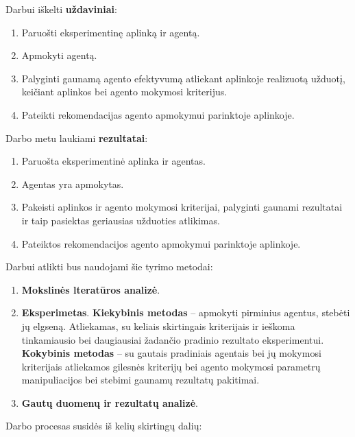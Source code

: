 \documentclass{VUMIFPSbakalaurinis}
\begin{document}
Darbui iškelti \textbf{uždaviniai}:\par

\begin{enumerate}
	\item Paruošti eksperimentinę aplinką ir agentą.
	\item Apmokyti agentą.
	\item Palyginti gaunamą agento efektyvumą atliekant aplinkoje realizuotą užduotį, keičiant aplinkos bei agento mokymosi kriterijus.
	\item Pateikti rekomendacijas agento apmokymui parinktoje aplinkoje.
\end{enumerate}

Darbo metu laukiami \textbf{rezultatai}:

\begin{enumerate}
	\item Paruošta eksperimentinė aplinka ir agentas.
	\item Agentas yra apmokytas.
	\item Pakeisti aplinkos ir agento mokymosi kriterijai, palyginti gaunami rezultatai ir taip pasiektas geriausias užduoties atlikimas.
	\item Pateiktos rekomendacijos agento apmokymui parinktoje aplinkoje.
\end{enumerate}

Darbui atlikti bus naudojami šie tyrimo metodai:

\begin{enumerate}
	\item \textbf{Mokslinės lteratūros analizė}.
	\item \textbf{Eksperimetas}.
	\subitem \textbf{Kiekybinis metodas} -- apmokyti pirminius agentus, stebėti jų elgseną. Atliekamas, su keliais skirtingais kriterijais ir ieškoma tinkamiausio bei daugiausiai žadančio pradinio rezultato eksperimentui.
	\subitem \textbf{Kokybinis metodas} -- su gautais pradiniais agentais bei jų mokymosi kriterijais atliekamos gilesnės kriterijų bei agento mokymosi parametrų manipuliacijos bei stebimi gaunamų rezultatų pakitimai.
	\item \textbf{Gautų duomenų ir rezultatų analizė}.
\end{enumerate}

Darbo procesas susidės iš kelių skirtingų dalių:
\end{document}
